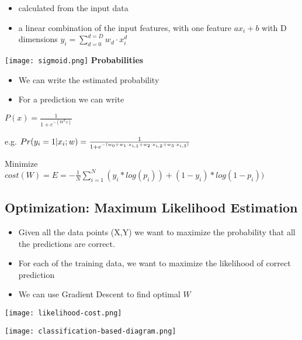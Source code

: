 \begin{itemize}
    \item calculated from the input data
    \item a linear combination of the input features, with one feature $ax_i + b$ with D dimensions $y_i=\sum_{d=0}^{d=D}w_d \cdot x_i^d$
\end{itemize}

\texttt{[image: sigmoid.png]}
\textbf{Probabilities}
\begin{itemize}
    \item We can write the estimated probability
    \item For a prediction we can write
\end{itemize}
\begin{center}
    $P(x) = \frac{1}{1 + e^{-(W^{T}x)}}$
\end{center}
\begin{center}
    e.g. $Pr(y_i = 1 | x_i; w) = \Large \frac {1}{1 + e^{-(w_0 + w_1 \cdot x_{i, 1} + w_2 \cdot x_{i, 2} + w_3 \cdot x_{i, 3})}}$
\end{center}
\begin{center}
    Minimize $cost(W) = E = -\frac{1}{N}\sum_{i=1}^N (y_i * log(p_i)) + (1 - y_i) * log(1 - p_i))$
\end{center}

\subsection{Optimization: Maximum Likelihood Estimation}
\begin{itemize}
    \item Given all the data points (X,Y) we want to maximize the probability that all the predictions are correct.
    \item For each of the training data, we want to maximize the likelihood of correct prediction
    \item We can use Gradient Descent to find optimal $W$
\end{itemize}
\texttt{[image: likelihood-cost.png]}

\texttt{[image: classification-based-diagram.png]}
